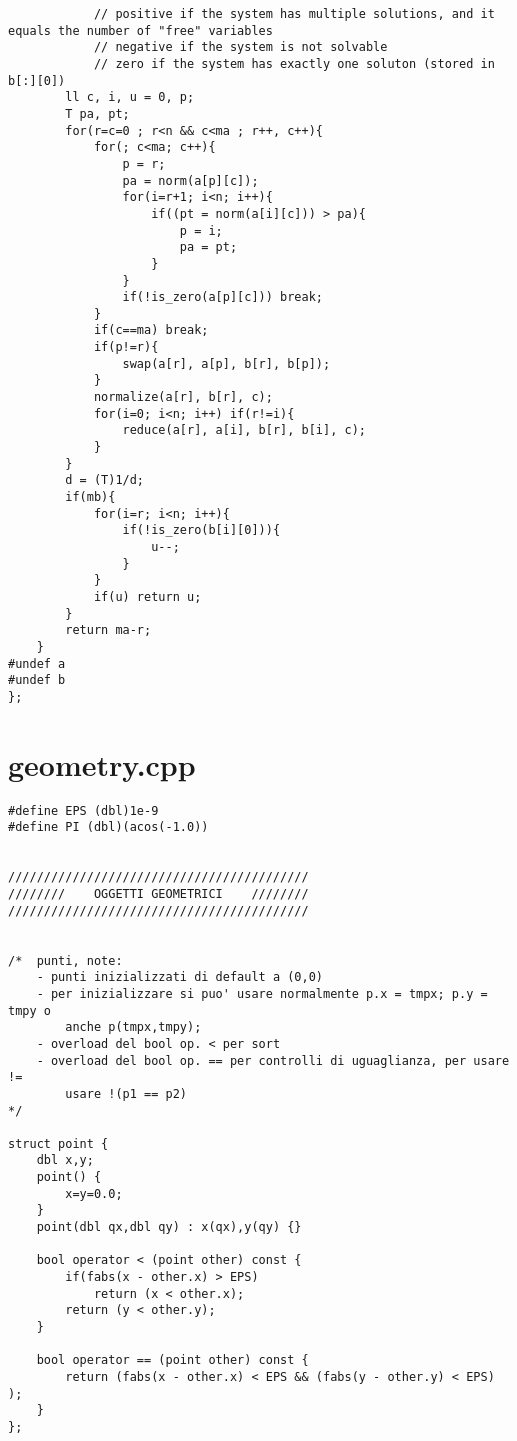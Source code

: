 \documentclass[a4paper,landscape,8pt]{extarticle}
\begin{document}
\begin{multicols}{3}
\begin{lstlisting}
            // positive if the system has multiple solutions, and it equals the number of "free" variables
            // negative if the system is not solvable
            // zero if the system has exactly one soluton (stored in b[:][0])
        ll c, i, u = 0, p;
        T pa, pt;
        for(r=c=0 ; r<n && c<ma ; r++, c++){
            for(; c<ma; c++){
                p = r;
                pa = norm(a[p][c]);
                for(i=r+1; i<n; i++){
                    if((pt = norm(a[i][c])) > pa){
                        p = i;
                        pa = pt;
                    }
                }
                if(!is_zero(a[p][c])) break;
            }
            if(c==ma) break;
            if(p!=r){
                swap(a[r], a[p], b[r], b[p]);
            }
            normalize(a[r], b[r], c);
            for(i=0; i<n; i++) if(r!=i){
                reduce(a[r], a[i], b[r], b[i], c);
            }
        }
        d = (T)1/d;
        if(mb){
            for(i=r; i<n; i++){
                if(!is_zero(b[i][0])){
                    u--;
                }
            }
            if(u) return u;
        }
        return ma-r;
    }
#undef a
#undef b
};
\end{lstlisting}

\section*{geometry.cpp}

\begin{lstlisting}
#define EPS (dbl)1e-9
#define PI (dbl)(acos(-1.0))


//////////////////////////////////////////
////////    OGGETTI GEOMETRICI    ////////
//////////////////////////////////////////


/*  punti, note:
    - punti inizializzati di default a (0,0)
    - per inizializzare si puo' usare normalmente p.x = tmpx; p.y = tmpy o
        anche p(tmpx,tmpy);
    - overload del bool op. < per sort
    - overload del bool op. == per controlli di uguaglianza, per usare !=
        usare !(p1 == p2)												*/

struct point {
    dbl x,y;
    point() {
        x=y=0.0;
    }
    point(dbl qx,dbl qy) : x(qx),y(qy) {}

    bool operator < (point other) const {
        if(fabs(x - other.x) > EPS)
            return (x < other.x);
        return (y < other.y);
    }

    bool operator == (point other) const {
        return (fabs(x - other.x) < EPS && (fabs(y - other.y) < EPS) );
    }
};



\end{lstlisting}
\end{multicols}
\end{document}
